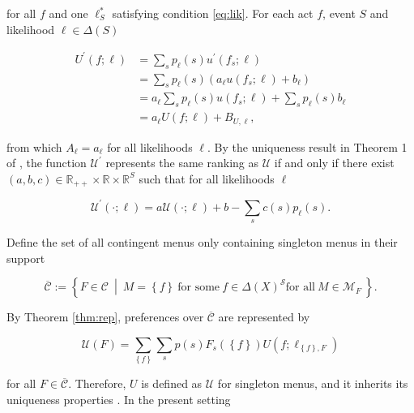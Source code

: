 \begin{corproof}
	for all \( f \) and one \( \ell^{*}_S \) satisfying condition \eqref{eq:lik}. For each act \( f \), event \( S \) and likelihood \( \ell \in \Delta \left( S \right) \)

	\begin{align*}
		U^{\prime} \left( f ; \ell \right) & = \sum_{s} p_{\ell} \left( s \right) u^{\prime} \left( f_{s} ; \ell \right)                                               \\
		                                   & = \sum_{s} p_{\ell} \left( s \right) \left(a_{\ell} u \left( f_{s} ; \ell \right) + b_{\ell} \right)                      \\
		                                   & = a_{\ell} \sum_{s} p_{\ell} \left( s \right) u \left( f_{s} ; \ell \right) + \sum_{s} p_{\ell} \left( s \right) b_{\ell} \\
		                                   & = a_{\ell} U \left( f; \ell \right) + B_{U,\ell},
	\end{align*}

	from which \( A_{\ell} = a_{\ell} \) for all likelihoods \( \ell \). By the uniqueness result in Theorem 1 of \cite{liangInformationdependentExpectedUtility2017}, the function \( \mathcal{U}^{\prime} \) represents the same ranking as \( \mathcal{U} \) if and only if there exist \( \left( a, b, c \right) \in \mathbb{R}_{++} \times \mathbb{R} \times \mathbb{R}^{S} \) such that for all likelihoods \( \ell \)

	\[
		\mathcal{U}^{\prime} \left(\cdot ; \ell \right) = a \mathcal{U} \left( \cdot ; \ell  \right) + b - \sum_{s} c \left( s \right) p_{\ell} \left( s \right) .
	\]

	Define the set of all contingent menus only containing singleton menus in their support

	\[
		\overline{\mathcal{C}} := \left\{ F \in \mathcal{C} \: \middle\vert  \: M = \left\{ f \right\} \: \text{for some} \: f \in \Delta \left( X \right)^\mathcal{S} \text{for all} \: M \in \mathcal{M}_F \: \right\} .
	\]

	By Theorem \ref{thm:rep}, preferences over \( \overline{\mathcal{C}} \) are represented by

	\[
		\mathscr{U} \left( F \right) = \sum_{\left\{ f \right\} } \sum_{s} p \left( s \right) F_s \left( \left\{ f \right\} \right) U \left( f ; \ell_{\left\{ f \right\},F} \right)
	\]

	for all \( F \in \overline{\mathcal{C}} \). Therefore, \( U \) is defined as \( \mathcal{U} \) for singleton menus, and it inherits its uniqueness properties \citep{kopylovTemptationsGeneralSettings2009}. In the present setting


\end{corproof}
